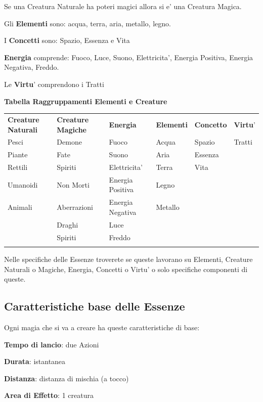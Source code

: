 \documentclass[a4paper,11pt,twoside,openany]{book}
\begin{document}
Se una Creatura Naturale ha poteri magici allora si e' una Creatura Magica.

Gli \textbf{Elementi} sono: acqua, terra, aria, metallo, legno. 

I \textbf{Concetti} sono: Spazio, Essenza e Vita

\textbf{Energia} comprende: Fuoco, Luce, Suono, Elettricita', Energia Positiva, Energia Negativa, Freddo.

Le \textbf{Virtu}' comprendono i Tratti

\bigskip

\textbf{Tabella Raggruppamenti Elementi e Creature}

\medskip

\begin{tabular}{llllll}
\toprule
\textbf{Creature Naturali} & \textbf{Creature Magiche} & \textbf{Energia} & \textbf{Elementi} & \textbf{Concetto} & \textbf{Virtu}'\tabularnewline
Pesci & Demone & Fuoco & Acqua & Spazio & Tratti\tabularnewline
Piante & Fate & Suono & Aria & Essenza & \tabularnewline
Rettili & Spiriti & Elettricita' & Terra & Vita & \tabularnewline
Umanoidi & Non Morti & Energia Positiva & Legno & & \tabularnewline
Animali & Aberrazioni & Energia Negativa & Metallo & & \tabularnewline
 & Draghi & Luce & & & \tabularnewline
 & Spiriti & Freddo & & & \tabularnewline
 & & & & & \tabularnewline
\end{tabular}

\bigskip

Nelle specifiche delle Essenze troverete se queste lavorano su Elementi, Creature Naturali o Magiche, Energia, Concetti o Virtu' o solo specifiche componenti di queste.

\subsection{Caratteristiche base delle Essenze}

\label{caratteristiche-base-delle-essenze}

Ogni magia che si va a creare ha queste caratteristiche di base:

\smallskip

\textbf{Tempo di lancio}: due Azioni

\textbf{Durata}: istantanea

\textbf{Distanza}: distanza di mischia (a tocco)

\textbf{Area di Effetto}: 1 creatura 
\end{document}

